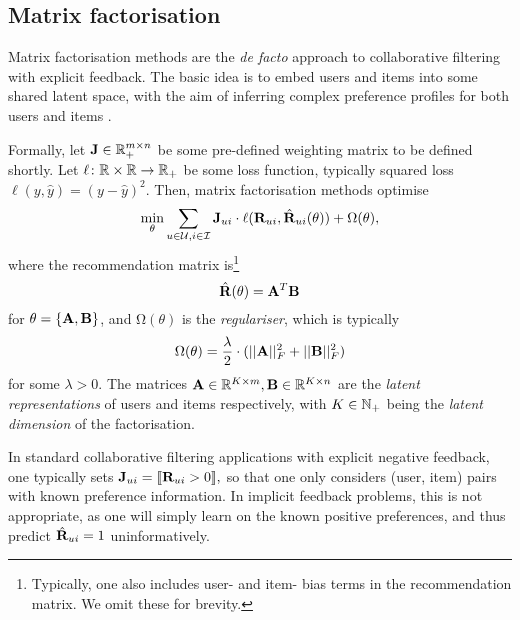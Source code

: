 \subsection{Matrix factorisation}

Matrix factorisation methods are the \emph{de facto} approach to collaborative filtering with explicit feedback.
The basic idea is to embed users and items into some shared latent space, with the aim of inferring complex preference profiles for both users and items \citep{Srebro:2003, Koren:2009}.

Formally, let $\mathbf{J} \in \mathbb{R}_+^{m \times n}$ be some pre-defined weighting matrix to be defined shortly.
Let $\ell \colon \mathbb{R} \times \mathbb{R} \to \mathbb{R}_+$ be some loss function, typically squared loss $\ell( y, \hat{y} ) = (y - \hat{y})^2$.
Then, matrix factorisation methods optimise
\begin{equation}
\label{eqn:wrmf}
\min_{ \theta } \sum_{ u \in \mathcal{U}, i \in \mathcal{I} } \mathbf{J}_{ui} \cdot \ell( \mathbf{R}_{ui}, \hat{\mathbf{R}}_{ui}( \theta ) ) + \mathrm{\Omega}( \theta ) ,
\end{equation}
where the recommendation matrix is\footnote{Typically, one also includes user- and item- bias terms in the recommendation matrix. We omit these for brevity.}
\begin{equation}
\label{eqn:factorisation}
\hat{\mathbf{R}}(\theta) = \mathbf{A}^T \mathbf{B}
\end{equation}
for $\theta = \{ \mathbf{A}, \mathbf{B} \}$, 
and $\mathrm{\Omega}( \theta )$ is the \emph{regulariser}, which is typically
$$\mathrm{\Omega}( \theta ) = \frac{\lambda}{2} \cdot ( ||\mathbf{A}||_F^2 + ||\mathbf{B}||_F^2 )$$
for some $\lambda > 0$.
The matrices $\mathbf{A} \in \mathbb{R}^{K \times m}, \mathbf{B} \in \mathbb{R}^{K \times n}$ are the \emph{latent representations} of users and items respectively, with $K \in \mathbb{N}_+$ being the \emph{latent dimension} of the factorisation.

In standard collaborative filtering applications with explicit negative feedback, one typically sets \citep{Koren:2009} $\mathbf{J}_{ui} = \llbracket  \mathbf{R}_{ui} > 0  \rrbracket,$
so that one only considers (user, item) pairs with known preference information.
In implicit feedback problems, this is not appropriate, as one will simply learn on the known positive preferences, and thus predict $\hat{\mathbf{R}}_{ui} = 1$ uninformatively.

